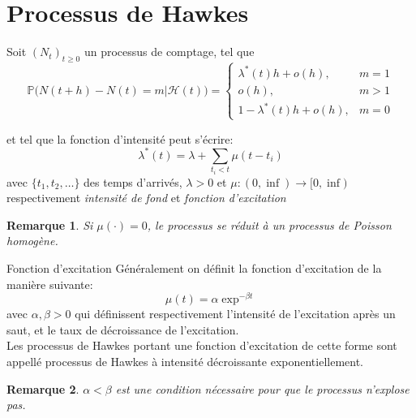\documentclass{beamer}
\newtheorem{remark}{Remarque}
\begin{document}
\section{Processus de Hawkes}

\begin{frame}
  \begin{definition}
    Soit $(N_t)_{t\geq 0}$ un processus de comptage, tel que
    \begin{equation*}
      \mathbb{P}\bigl(N(t+h) - N(t) = m | \mathcal{H}(t)\bigr) = \begin{cases}
        \lambda^*(t)h + o(h), &m=1 \\
        o(h), &m > 1\\
        1 - \lambda^*(t)h + o(h), &m=0
      \end{cases}
    \end{equation*}
  \end{definition}
 \pause
 et tel que la fonction d'intensité peut s'écrire:
  \begin{equation*}
    \lambda^*(t) = \lambda + \sum_{t_i < t} \mu(t-t_i)
  \end{equation*}
  avec $\{t_1, t_2, \dots\}$ des temps d'arrivés, $\lambda > 0$ et $\mu :(0, \inf) \rightarrow [0,\inf)$ respectivement \textit{intensité de fond} et \textit{fonction d'excitation}

  \pause
  \begin{remark}
    Si $\mu(\text{·}) = 0 $, le processus se réduit à un processus de Poisson homogène.
  \end{remark}

\end{frame}

\begin{frame}{Fonction d'excitation}
  Généralement on définit la fonction d'excitation de la manière suivante:
  \begin{equation*}
    \mu(t) = \alpha \exp^{-\beta t}
  \end{equation*}
  avec $\alpha, \beta>0$ qui définissent respectivement l'intensité de l'excitation après un saut, et le taux de décroissance de l'excitation.\\
  Les processus de Hawkes portant une fonction d'excitation de cette forme sont appellé processus de Hawkes à intensité décroissante exponentiellement.

\pause

  \begin{remark}
    $\alpha < \beta$ est une condition nécessaire pour que le processus n'explose pas.
  \end{remark}
\end{frame}
\end{document}
